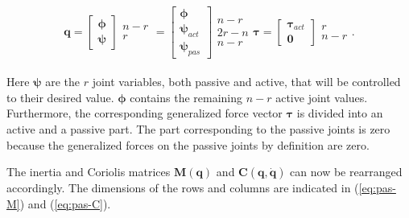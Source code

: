 \begin{subequations}
\begin{equation}
    \mathbf{q} = 
    \begin{bmatrix}
        \boldsymbol{\phi} \\ \boldsymbol{\psi}
    \end{bmatrix}
    \begin{matrix}
        n-r\\r
    \end{matrix}
    =
    \begin{bmatrix}
        \boldsymbol{\phi} \\ \boldsymbol{\psi}_{act} \\ \boldsymbol{\psi}_{pas}
    \end{bmatrix}
    \begin{matrix}
        n-r\\2r-n \\n-r
    \end{matrix}
\end{equation}
\begin{equation}
    \boldsymbol{\tau} = 
    \begin{bmatrix}
        \boldsymbol{\tau}_{act} \\ \mathbf{0}
    \end{bmatrix}
    \begin{matrix}
        r\\n-r
    \end{matrix}.
\end{equation}
\end{subequations}
\\
Here $\boldsymbol{\psi}$ are the $r$ joint variables, both passive and active, that will be controlled to their desired value. $\boldsymbol{\phi}$ contains the remaining $n-r$ active joint values. Furthermore, the corresponding generalized force vector $\boldsymbol{\tau}$ is divided into an active and a passive part. The part corresponding to the passive joints is zero because the generalized forces on the passive joints by definition are zero.

The inertia and Coriolis matrices $\mathbf{M(q)}$ and $\mathbf{C(q,\dot{q})}$ can now be rearranged accordingly. The dimensions of the rows and columns are indicated in (\ref{eq:pas-M}) and (\ref{eq:pas-C}).


